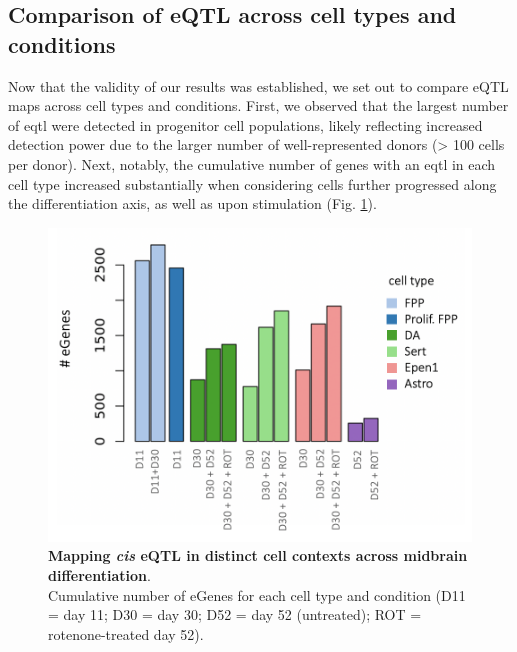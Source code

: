 

\clearpage

\subsection{Comparison of eQTL across cell types and conditions}

Now that the validity of our results was established, we set out to compare eQTL maps across cell types and conditions.
First, we observed that the largest number of \gls{eqtl} were detected in progenitor cell populations, likely reflecting increased detection power due to the larger number of well-represented donors (> 100 cells per donor). 
Next, notably, the cumulative number of genes with an \gls{eqtl} in each cell type increased substantially when considering cells further progressed along the differentiation axis, as well as upon stimulation (Fig. \ref{fig:neuroseq_eqtl}). 


\begin{figure}[h]
\centering
\includegraphics[width=14cm]{Chapter5/Fig/neuroseq_eqtl_cumulative.png}
\caption[Mapping eQTL across neuronal cell types]{\textbf{Mapping \textit{cis} eQTL in distinct cell contexts across midbrain differentiation}.\\
Cumulative number of eGenes for each cell type and condition (D11 = day 11; D30 = day 30; D52 = day 52 (untreated); ROT = rotenone-treated day 52).}
\label{fig:neuroseq_eqtl}
\end{figure}

